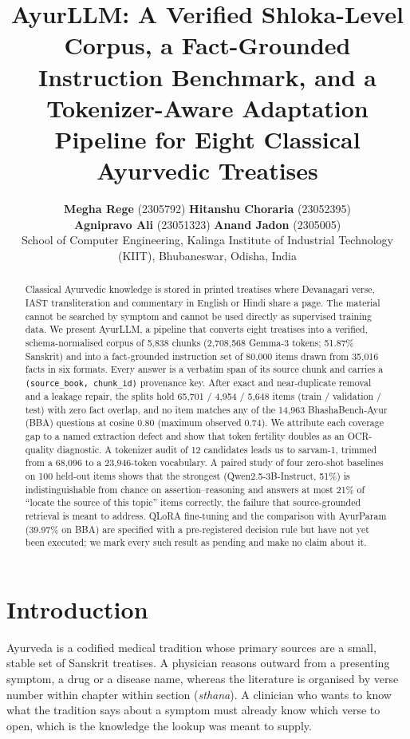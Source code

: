 \documentclass[10pt,twocolumn,letterpaper]{article}
\title{\vspace{-1.2em}\textbf{\fontsize{13.5}{15.5}\selectfont
AyurLLM: A Verified Shloka-Level Corpus, a Fact-Grounded Instruction Benchmark,
and a Tokenizer-Aware Adaptation Pipeline for Eight Classical Ayurvedic Treatises}\vspace{-0.3em}}
\author{
  \textbf{Megha Rege} (2305792) \quad \textbf{Hitanshu Choraria} (23052395) \\
  \textbf{Agnipravo Ali} (23051323) \quad \textbf{Anand Jadon} (2305005) \\[4pt]
  \small School of Computer Engineering, Kalinga Institute of Industrial Technology (KIIT), Bhubaneswar, Odisha, India
}
\date{}
\begin{document}
\maketitle

\begin{abstract}
Classical Ayurvedic knowledge is stored in printed treatises where Devanagari verse,
IAST transliteration and commentary in English or Hindi share a page. The material
cannot be searched by symptom and cannot be used directly as supervised training data.
We present AyurLLM, a pipeline that converts eight treatises into a verified,
schema-normalised corpus of 5{,}838 chunks (2{,}708{,}568 Gemma-3 tokens; 51.87\%
Sanskrit) and into a fact-grounded instruction set of 80{,}000 items drawn from
35{,}016 facts in six formats. Every answer is a verbatim span of its source chunk
and carries a \texttt{(source\_book, chunk\_id)} provenance key. After exact and
near-duplicate removal and a leakage repair, the splits hold 65{,}701 / 4{,}954 / 5{,}648
items (train / validation / test) with zero fact overlap, and no item matches any
of the 14{,}963 BhashaBench-Ayur (BBA) questions at cosine 0.80 (maximum observed 0.74).
We attribute each coverage gap to a named extraction defect and show that token
fertility doubles as an OCR-quality diagnostic. A tokenizer audit of 12 candidates
leads us to sarvam-1, trimmed from a 68{,}096 to a 23{,}946-token vocabulary. A
paired study of four zero-shot baselines on 100 held-out items shows that the
strongest (Qwen2.5-3B-Instruct, 51\%) is indistinguishable from chance on
assertion--reasoning and answers at most 21\% of ``locate the source of this topic''
items correctly, the failure that source-grounded retrieval is meant to address.
QLoRA fine-tuning and the comparison with AyurParam (39.97\% on BBA) are specified
with a pre-registered decision rule but have not yet been executed; we mark every
such result as pending and make no claim about it.
\end{abstract}

\section{Introduction}

Ayurveda is a codified medical tradition whose primary sources are a small,
stable set of Sanskrit treatises. A physician reasons outward from a presenting
symptom, a drug or a disease name, whereas the literature is organised by verse
number within chapter within section (\emph{sthana}). A clinician who wants to
know what the tradition says about a symptom must already know which verse to open,
which is the knowledge the lookup was meant to supply.
\end{document}
